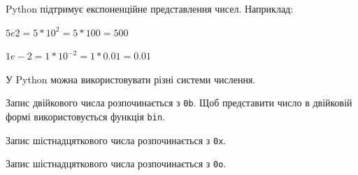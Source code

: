 \begin{frame}
Python підтримує експоненційне представлення чисел. Наприклад:

$5e2 = 5\ast 10^2 = 5\ast 100 = 500$

$1e-2 = 1\ast 10^{-2} = 1\ast 0.01 = 0.01$  
\end{frame}

\begin{frame}
У Python можна використовувати різні системи числення. 

Запис двійкового числа розпочинається з \texttt{0b}. Щоб представити число в двійковій формі використовується функція \texttt{bin}.

Запис шістнадцяткового числа розпочинається з \texttt{0x}.

Запис шістнадцяткового числа розпочинається з \texttt{0o}. 

\end{frame}
